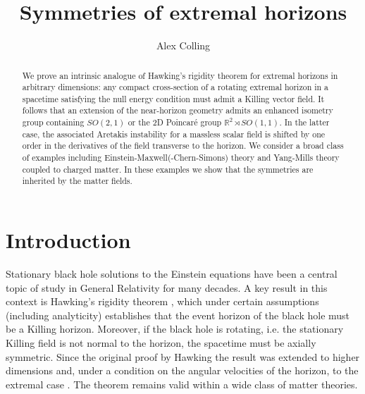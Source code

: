 \documentclass[11pt, reqno]{amsart}
\theoremstyle{plain}
\theoremstyle{definition}
\numberwithin{equation}{section}
\begin{document}
\title[]{Symmetries of extremal horizons}
\author{Alex Colling}
\address{Department of Applied Mathematics and Theoretical Physics\\ 
University of Cambridge\\ Wilberforce Road, Cambridge CB3 0WA, UK.}




\begin{abstract}
We prove an intrinsic analogue of Hawking's rigidity theorem for extremal horizons in arbitrary dimensions: any compact cross-section of a rotating extremal horizon in a spacetime satisfying the null energy condition must admit a Killing vector field. It follows that an extension of the near-horizon geometry admits an enhanced isometry group containing $SO(2,1)$ or the 2D Poincaré group $\mathbb{R}^2 \rtimes SO(1,1)$. In the latter case, the associated Aretakis instability for a massless scalar field is shifted by one order in the derivatives of the field transverse to the horizon. We consider a broad class of examples including Einstein-Maxwell(-Chern-Simons) theory and Yang-Mills theory coupled to charged matter. In these examples we show that the symmetries are inherited by the matter fields.
\end{abstract}

\maketitle

\section{Introduction}
Stationary black hole solutions to the Einstein equations have been a central topic of study in General Relativity for many decades. A key result in this context is Hawking's rigidity theorem \cite{H72,HE73, C96, FRW98}, which under certain assumptions (including analyticity) establishes that the event horizon of the black hole must be a Killing horizon. Moreover, if the black hole is rotating, i.e. the stationary Killing field is not normal to the horizon, the spacetime must be axially symmetric. Since the original proof by Hawking the result was extended to higher dimensions \cite{HIW07,MI08} and, under a condition on the angular velocities of the horizon, to the extremal case \cite{HI09}. The theorem remains valid within a wide class of matter theories.
\end{document}
